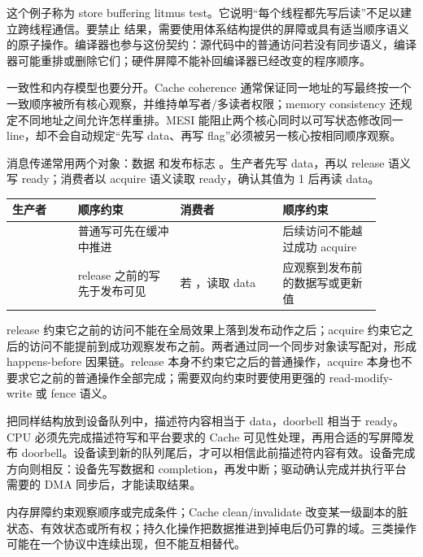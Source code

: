 这个例子称为 store buffering litmus test。它说明“每个线程都先写后读”不足以建立跨线程通信。要禁止  结果，需要使用体系结构提供的屏障或具有适当顺序语义的原子操作。编译器也参与这份契约：源代码中的普通访问若没有同步语义，编译器可能重排或删除它们；硬件屏障不能补回编译器已经改变的程序顺序。

一致性和内存模型也要分开。Cache coherence 通常保证同一地址的写最终按一个一致顺序被所有核心观察，并维持单写者/多读者权限；memory consistency 还规定不同地址之间允许怎样重排。MESI 能阻止两个核心同时以可写状态修改同一 line，却不会自动规定“先写 data、再写 flag”必须被另一核心按相同顺序观察。


消息传递常用两个对象：数据  和发布标志 。生产者先写 data，再以 release 语义写 ready；消费者以 acquire 语义读取 ready，确认其值为 1 后再读 data。

\begin{longtable}{L{0.16\linewidth}L{0.25\linewidth}L{0.25\linewidth}L{0.24\linewidth}}
\toprule
生产者 & 顺序约束 & 消费者 & 顺序约束 \\
\midrule
{} & 普通写可先在缓冲中推进 &  & 后续访问不能越过成功 acquire \\
 & release 之前的写先于发布可见 & 若 ，读取 data & 应观察到发布前的数据写或更新值 \\
\bottomrule
\end{longtable}

release 约束它之前的访问不能在全局效果上落到发布动作之后；acquire 约束它之后的访问不能提前到成功观察发布之前。两者通过同一个同步对象读写配对，形成 happens-before 因果链。release 本身不约束它之后的普通操作，acquire 本身也不要求它之前的普通操作全部完成；需要双向约束时要使用更强的 read-modify-write 或 fence 语义。

把同样结构放到设备队列中，描述符内容相当于 data，doorbell 相当于 ready。CPU 必须先完成描述符写和平台要求的 Cache 可见性处理，再用合适的写屏障发布 doorbell。设备读到新的队列尾后，才可以相信此前描述符内容有效。设备完成方向则相反：设备先写数据和 completion，再发中断；驱动确认完成并执行平台需要的 DMA 同步后，才能读取结果。


内存屏障约束观察顺序或完成条件；Cache clean/invalidate 改变某一级副本的脏状态、有效状态或所有权；持久化操作把数据推进到掉电后仍可靠的域。三类操作可能在一个协议中连续出现，但不能互相替代。

